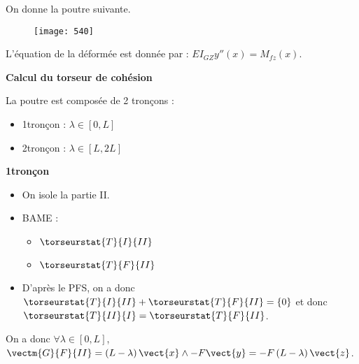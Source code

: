 \normaltrue
\correctionfalse


\setcounter{question}{0}%

\ifcorrection
\else
{}
\fi

On donne la poutre suivante. 




\begin{figure}[H]
\centering
\texttt{[image: 540]}
\end{figure}

\ifprof

L'équation de la déformée est donnée par : $EI_{GZ}y''(x)=M_{fz}(x)$.

\textbf{Calcul du torseur de cohésion}

La poutre est composée de 2 tronçons :
\begin{itemize}
\item 1\ier tronçon : $\lambda\in[0,L]$
\item 2\ieme tronçon : $\lambda\in[L,2L]$
\end{itemize}

\textbf{1\ier tronçon}
\begin{itemize}
\item On isole la partie II.
\item BAME : 
\begin{itemize}
\item $\torseurstat{T}{I}{II}$
\item $\torseurstat{T}{F}{II}$
\end{itemize}
\item D'après le PFS, on a donc $\torseurstat{T}{I}{II} + \torseurstat{T}{F}{II} = \{0\}$ et donc 
$\torseurstat{T}{II}{I} =  \torseurstat{T}{F}{II}$.
\end{itemize}
On a donc $\forall \lambda\in[0,L]$, $\vectm{G}{F}{II}=  \left(L-\lambda\right)\vect{x} \wedge - F\vect{y} =-F\left(L-\lambda\right) \vect{z} $. 


